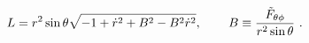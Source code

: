 \begin{equation} L=r^2 \sin  \theta
\sqrt{-1+\dot{r}^2+B^2-B^2\dot{r}^2} , \hspace{.3in} B \equiv
\frac{\tilde{F}_{\theta \phi}}{r^2\sin\theta} \ .
\end{equation}

